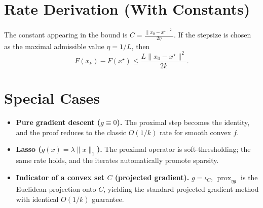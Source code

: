 \documentclass{article}
\newcommand{\prox}{\operatorname{prox}}
\begin{document}
\section*{Rate Derivation (With Constants)}
The constant appearing in the bound is $\displaystyle C=\frac{\|x_{0}-x^{\star}\|^{2}}{2\eta}$.
If the stepsize is chosen as the maximal admissible value $\eta=1/L$, then
\[
F(x_{k})-F(x^{\star})\le \frac{L\|x_{0}-x^{\star}\|^{2}}{2k}.
\]

\section*{Special Cases}
\begin{itemize}
\item \textbf{Pure gradient descent ($g\equiv0$).} The proximal step becomes the identity, and the proof reduces to the classic $O(1/k)$ rate for smooth convex $f$.
\item \textbf{Lasso ($g(x)=\lambda\|x\|_{1}$).} The proximal operator is soft‑thresholding; the same rate holds, and the iterates automatically promote sparsity.
\item \textbf{Indicator of a convex set $C$ (projected gradient).} $g=\iota_{C}$, $\prox_{\eta g}$ is the Euclidean projection onto $C$, yielding the standard projected gradient method with identical $O(1/k)$ guarantee.
\end{itemize}
\end{document}
